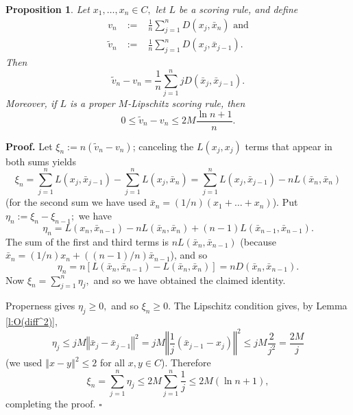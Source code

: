 \documentclass[12pt,a4paper,notitlepage]{article}
\newtheorem{proposition}[theorem]{Proposition}
\newenvironment{proof}[1][Proof]{\noindent\textbf{#1.} }{\hfill $\square$}
\begin{document}
\begin{proposition}
\label{p:online-offline}Let $x_{1},\ldots ,x_{n}\in C,$ let $L$ be a scoring
rule, and define%
\begin{eqnarray*}
v_{n} &%
{\;:=\;}%
&\frac{1}{n}\sum_{j=1}^{n}D(x_{j},\bar{x}_{n})\text{ and} \\
\widetilde{v}_{n} &%
{\;:=\;}%
&\frac{1}{n}\sum_{j=1}^{n}D(x_{j},\bar{x}_{j-1}).
\end{eqnarray*}%
Then%
\begin{equation}
\widetilde{v}_{n}-v_{n}=\frac{1}{n}\sum_{j=1}^{n}jD(\bar{x}_{j},\bar{x}%
_{j-1}).  \label{eq:v-online-error}
\end{equation}%
Moreover, if $L$ is a proper $M$-Lipschitz scoring rule, then%
\begin{equation*}
0\leq \widetilde{v}_{n}-v_{n}\leq 2M\frac{\ln n+1}{n}.
\end{equation*}
\end{proposition}

\begin{proof}
Let $\xi _{n}:=n(\widetilde{v}_{n}-v_{n})$; canceling the $L(x_{j},x_{j})$
terms that appear in both sums yields 
\begin{equation*}
\xi _{n}=\sum_{j=1}^{n}L(x_{j},\bar{x}_{j-1})-\sum_{j=1}^{n}L(x_{j},\bar{x}%
_{n})=\sum_{j=1}^{n}L(x_{j},\bar{x}_{j-1})-nL(\bar{x}_{n},\bar{x}_{n})
\end{equation*}%
(for the second sum we have used $\bar{x}_{n}=(1/n)(x_{1}+\ldots +x_{n})$).
Put $\eta _{n}:=\xi _{n}-\xi _{n-1};$ we have%
\begin{equation*}
\eta _{n}=L(x_{n},\bar{x}_{n-1})-nL(\bar{x}_{n},\bar{x}_{n})+(n-1)L(\bar{x}%
_{n-1},\bar{x}_{n-1}).
\end{equation*}%
The sum of the first and third terms is $nL(\bar{x}_{n},\bar{x}_{n-1})$
(because $\bar{x}_{n}=(1/n)x_{n}+((n-1)/n)\bar{x}_{n-1}$), and so%
\begin{equation*}
\eta _{n}=n\left[ L(\bar{x}_{n},\bar{x}_{n-1})-L(\bar{x}_{n},\bar{x}_{n})%
\right] =nD(\bar{x}_{n},\bar{x}_{n-1}).
\end{equation*}%
Now $\xi _{n}=\sum_{j=1}^{n}\eta _{j},$ and so we have obtained the claimed
identity.

Properness gives $\eta _{j}\geq 0,$ and so $\xi _{n}\geq 0.$ The Lipschitz
condition gives, by Lemma \ref{l:O(diff^2)},%
\begin{equation*}
\eta _{j}\leq jM\left\Vert \bar{x}_{j}-\bar{x}_{j-1}\right\Vert
^{2}=jM\left\Vert \frac{1}{j}(\bar{x}_{j-1}-x_{j})\right\Vert ^{2}\leq jM%
\frac{2}{j^{2}}=\frac{2M}{j}
\end{equation*}%
(we used $\left\Vert x-y\right\Vert ^{2}\leq 2$ for all $x,y\in C$).
Therefore%
\begin{equation*}
\xi _{n}=\sum_{j=1}^{n}\eta _{j}\leq 2M\sum_{j=1}^{n}\frac{1}{j}\leq 2M(\ln
n+1),
\end{equation*}%
completing the proof.
\end{proof}
\end{document}
